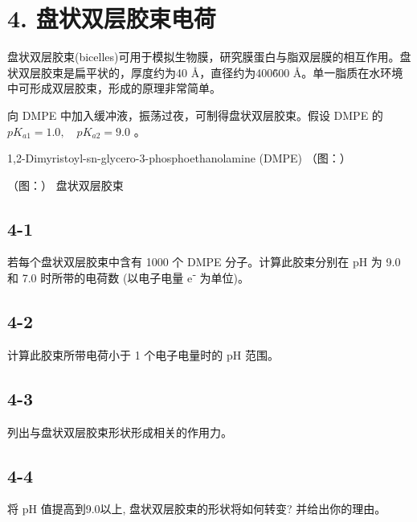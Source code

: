 \section*{4. 盘状双层胶束电荷}
盘状双层胶束(bicelles)可用于模拟生物膜，研究膜蛋白与脂双层膜的相互作用。盘状双层胶束是扁平状的，厚度约为40 Å，直径约为400\~600 Å。单一脂质在水环境中可形成双层胶束，形成的原理非常简单。

向 DMPE 中加入缓冲液，振荡过夜，可制得盘状双层胶束。假设 DMPE 的 $pK_{a1}=1.0,\quad pK_{a2}=9.0$ 。

1,2-Dimyristoyl-sn-glycero-3-phosphoethanolamine (DMPE)
（图：）

（图：）
盘状双层胶束

\subsection*{4-1}
若每个盘状双层胶束中含有 1000 个 DMPE 分子。计算此胶束分别在 pH 为 9.0 和 7.0 时所带的电荷数 (以电子电量 e⁻ 为单位)。

\subsection*{4-2}
计算此胶束所带电荷小于 1 个电子电量时的 pH 范围。

\subsection*{4-3}
列出与盘状双层胶束形状形成相关的作用力。

\subsection*{4-4}
将 $\mathrm{pH}$ 值提高到9.0以上, 盘状双层胶束的形状将如何转变? 并给出你的理由。
